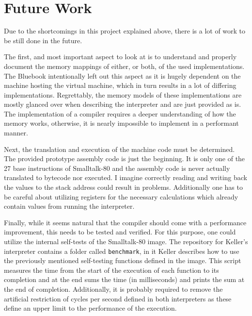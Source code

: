 \chapter{Future Work}\label{cha:futurework}
Due to the shortcomings in this project explained above, there is a lot of work to be still done in the future. 

The first, and most important aspect to look at is to understand and properly document the memory mappings of either, or both, of the used implementations. The Bluebook intentionally left out this aspect as it is hugely dependent on the machine hosting the virtual machine, which in turn results in a lot of differing implementations. Regrettably, the memory models of these implementations are mostly glanced over when describing the interpreter and are just provided as is. The implementation of a \jit{} compiler requires a deeper understanding of how the memory works, otherwise, it is nearly impossible to implement in a performant manner. 

Next, the translation and execution of the machine code must be determined. The provided prototype assembly code is just the beginning. It is only one of the 27 base instructions of Smalltalk-80 and the assembly code is never actually translated to bytecode nor executed. I imagine correctly reading and writing back the values to the stack address could result in problems. Additionally one has to be careful about utilizing registers for the necessary calculations which already contain values from running the interpreter. 

Finally, while it seems natural that the \jit{} compiler should come with a performance improvement, this needs to be tested and verified. For this purpose, one could utilize the internal self-tests of the Smalltalk-80 image. The repository for Keller's interpreter contains a folder called \texttt{benchmark}, in it Keller describes how to use the previously mentioned self-testing functions defined in the image. This script measures the time from the start of the execution of each function to its completion and at the end sums the time (in milliseconds) and prints the sum at the end of completion. Additionally, it is probably required to remove the artificial restriction of cycles per second defined in both interpreters as these define an upper limit to the performance of the execution. 
